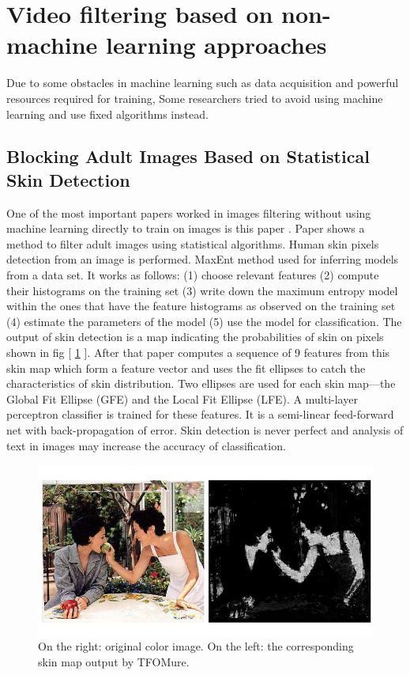 \documentclass[runningheads]{llncs}
\begin{document}
\section{Video filtering based on non-machine learning approaches}
Due to some obstacles in machine learning such as data acquisition and powerful resources required for training, Some researchers tried to avoid using machine learning and use fixed algorithms instead.\\

\subsection{Blocking Adult Images Based on Statistical Skin Detection \cite{zheng2004blocking} }

One of the most important papers worked in images filtering without using machine learning directly to train on images is this paper \cite{zheng2004blocking}. Paper \cite{zheng2004blocking} shows a method to filter adult images using statistical algorithms. Human skin pixels detection from an image is performed. MaxEnt method used for inferring models from a data set. It works as follows: (1) choose relevant features (2) compute their histograms on the training set (3) write down the maximum entropy model within the ones that have the feature histograms as observed on the training set (4)
estimate the parameters of the model (5) use the model for classification. The output of skin detection is a map indicating the probabilities of skin on pixels shown in fig [ \ref{skin_map} ]. After that paper \cite{zheng2004blocking} computes a sequence of 9 features from this skin
map which form a feature vector and uses the fit ellipses to catch the characteristics of skin distribution. Two
ellipses are used for each skin map—the Global Fit Ellipse (GFE) and the Local Fit Ellipse (LFE). A multi-layer perceptron classifier is trained for these features. It is a semi-linear feed-forward net with back-propagation
of error. Skin detection is never perfect and analysis of text in images may increase the accuracy of classification.\\

\begin{figure}
\centering
\includegraphics[width=1\textwidth]{figures/skin_map.jpg}
\caption{On the right: original color image. On the left: the corresponding skin map output by TFOMure. } \label{skin_map}
\end{figure}
\end{document}
